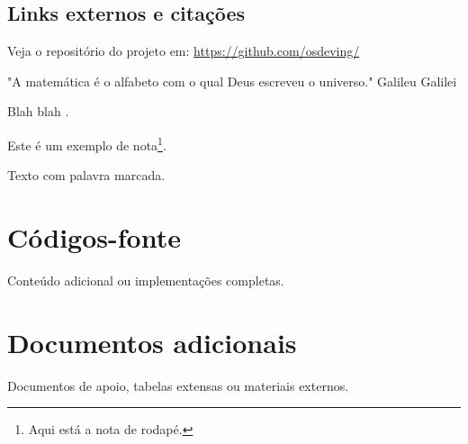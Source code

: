 \documentclass[12pt]{book}
\begin{document}
\section{Links externos e citações}
Veja o repositório do projeto em: \url{https://github.com/osdeving/}

\begin{displayquote}
"A matemática é o alfabeto com o qual Deus escreveu o universo." \textemdash{} Galileu Galilei
\end{displayquote}

Blah blah \cite{knuth1984}.

Este é um exemplo de nota\footnote{Aqui está a nota de rodapé.}.

Texto com palavra marcada.

\appendix
\chapter{Códigos-fonte}
Conteúdo adicional ou implementações completas.

\chapter{Documentos adicionais}
Documentos de apoio, tabelas extensas ou materiais externos.

\printindex
\end{document}

